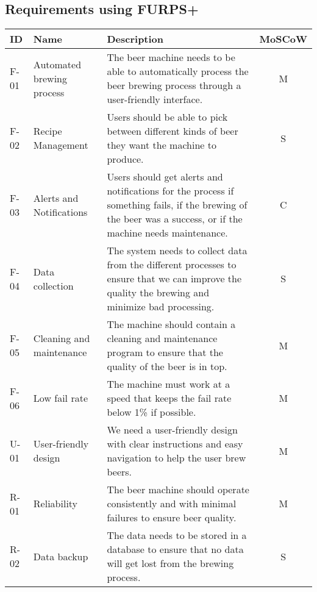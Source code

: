 \subsection{Requirements using FURPS+}
\begin{center}
    \sloppy
    \begin{longtable}{|p{1cm}|p{4cm}|p{8.5cm}|c|}
        \hline
        ID & Name & Description & MoSCoW \\ \hline
        F-01   & Automated brewing process  & The beer machine needs to be able to automatically process the beer brewing process through a user-friendly interface.                                        & M \\ \hline
        F-02   & Recipe Management          & Users should be able to pick between different kinds of beer they want the machine to produce.                                                                & S \\ \hline                                                          
        F-03   & Alerts and Notifications   & Users should get alerts and notifications for the process if something fails, if the brewing of the beer was a success, or if the machine needs maintenance.  & C \\ \hline
        F-04   & Data collection            & The system needs to collect data from the different processes to ensure that we can improve the quality the brewing and minimize bad processing.              & S \\ \hline
        F-05   & Cleaning and maintenance   & The machine should contain a cleaning and maintenance program to ensure that the quality of the beer is in top.                                               & M \\ \hline
        F-06   & Low fail rate              & The machine must work at a speed that keeps the fail rate below 1\% if possible.                                                                              & M \\ \hline
        U-01   & User-friendly design       & We need a user-friendly design with clear instructions and easy navigation to help the user brew beers.         & M \\ \hline
        R-01   & Reliability                & The beer machine should operate consistently and with minimal failures to ensure beer quality.                                                                & M \\ \hline
        R-02   & Data backup                & The data needs to be stored in a database to ensure that no data will get lost from the brewing process.                                                      & S \\ \hline

\end{longtable}
\end{center}
